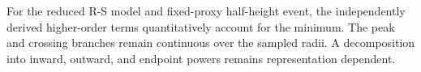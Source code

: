 For the reduced R-S model and fixed-proxy half-height event, the independently derived higher-order terms quantitatively account for the minimum. The peak and crossing branches remain continuous over the sampled radii. A decomposition into inward, outward, and endpoint powers remains representation dependent.
